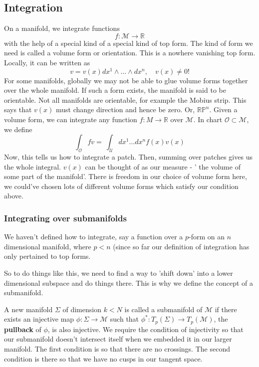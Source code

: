 \subsection{Integration} 
On a manifold, we integrate functions 
\[
	f : \mathcal{ M } \to \mathbb{ R } 
\] with the help of a special kind of 
a special kind of top form. 
The kind of form we need is called a volume form or orientation. 
This is a nowhere vanishing top form. Locally, 
it can be written as 
\[
v = v ( x) dx^ 1 \wedge  \dots \wedge  dx^ n , \quad v ( x) \neq 0 !
\] For some manifolds, globally we may not be able to glue
volume forms together over the whole manifold. 
If such a form exists, the manifold is said to be orientable. 
Not all manifolds are orientable, for example the Mobius strip. 
This says that $ v( x) $ must change direction and hence be zero. 
Or, $ \mathbb { RP } ^ n $. 
Given a volume form, we can integrate 
any function  $f: M \to \mathbb{ R} $ over  $ \mathcal{ M } $. 
In chart $ \mathcal{ O } \subset \mathcal{ M } $, we define
\[
\int_{ \mathcal{ O } } f v =  \ \int_{\mathcal{ U } } dx^ 1 \dots dx^ n f( x) v( x) 
\] Now, this tells us how to integrate a patch. 
Then, summing over patches gives us the whole integral. 
$ v ( x) $ can be thought of as our measure - ' the volume of some part of 
the manifold'. There is freedom in our choice of volume form here, 
we could've chosen lots of different volume forms which 
satisfy our condition above.

\subsubsection{Integrating over submanifolds} 

We haven't defined how to integrate, say a function 
over a $ p $-form on an 
$ n $ dimensional manifold, where $ p < n $ 
(since so far our definition of integration 
has only pertained to top forms. 

So to do things like this, we need to 
find a way to 'shift down' into a lower dimensional 
subspace and do things there. This is why we define the concept of a submanifold.

A new manifold $ \Sigma $ of dimension $ k < N $ is called a submanifold
of $ \mathcal{ M  }$ if there exists an injective map $ \phi : \Sigma \to \mathcal{ M }$ 
such that $ \phi^ * : T_p ( \Sigma ) \to T_p ( \mathcal{ M } ) $, the 
\textbf{pullback} of $ \phi $, is also 
injective. We require the condition of injectivity 
so that our submanifold doesn't intersect itself 
when we embedded it in our larger manifold.
The first condition is so that there are no crossings. 
The second condition is there so that we have no cusps in our tangent space.

